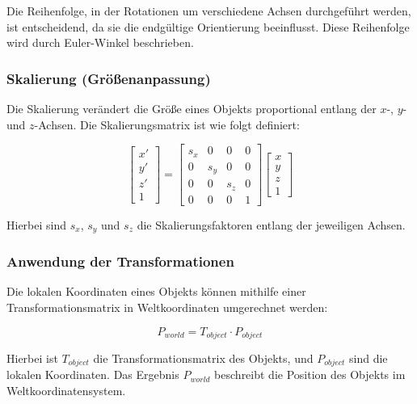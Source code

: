 Die Reihenfolge, in der Rotationen um verschiedene Achsen durchgeführt werden, ist entscheidend, da sie die endgültige Orientierung beeinflusst. Diese Reihenfolge wird durch Euler-Winkel beschrieben.

\subsubsection{Skalierung (Größenanpassung)}

Die Skalierung verändert die Größe eines Objekts proportional entlang der \(x\)-, \(y\)- und \(z\)-Achsen. Die Skalierungsmatrix ist wie folgt definiert:

\begin{equation}
\begin{bmatrix}
x' \\ y' \\ z' \\ 1
\end{bmatrix}
=
\begin{bmatrix}
s_x & 0 & 0 & 0 \\
0 & s_y & 0 & 0 \\
0 & 0 & s_z & 0 \\
0 & 0 & 0 & 1
\end{bmatrix}
\begin{bmatrix}
x \\ y \\ z \\ 1
\end{bmatrix}
\end{equation}

Hierbei sind \(s_x\), \(s_y\) und \(s_z\) die Skalierungsfaktoren entlang der jeweiligen Achsen.

\subsubsection{Anwendung der Transformationen}

Die lokalen Koordinaten eines Objekts können mithilfe einer Transformationsmatrix in Weltkoordinaten umgerechnet werden:

\begin{equation}
P_{world} = T_{object} \cdot P_{object}
\end{equation}

Hierbei ist \(T_{object}\) die Transformationsmatrix des Objekts, und \(P_{object}\) sind die lokalen Koordinaten. Das Ergebnis \(P_{world}\) beschreibt die Position des Objekts im Weltkoordinatensystem.


